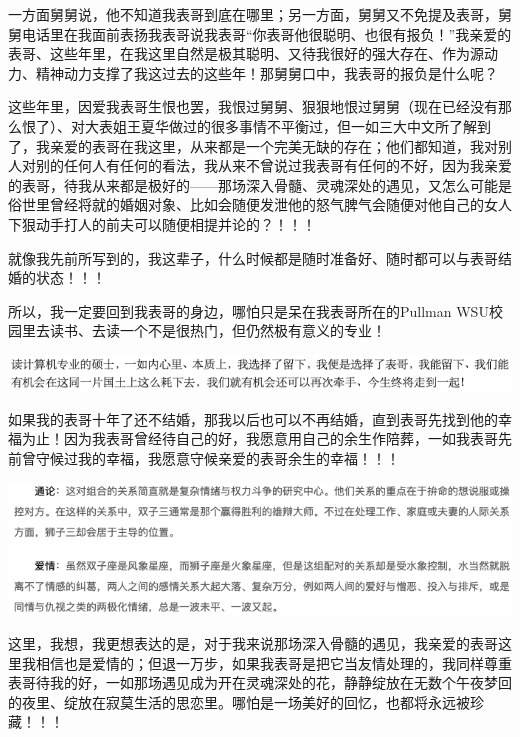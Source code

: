 \documentclass[9pt, b5paper]{article}
\begin{document}
一方面舅舅说，他不知道我表哥到底在哪里；另一方面，舅舅又不免提及表哥，舅舅电话里在我面前表扬我表哥说我表哥“你表哥他很聪明、也很有报负！”我亲爱的表哥、这些年里，在我这里自然是极其聪明、又待我很好的强大存在、作为源动力、精神动力支撑了我这过去的这些年！那舅舅口中，我表哥的报负是什么呢？

这些年里，因爱我表哥生恨也罢，我恨过舅舅、狠狠地恨过舅舅（现在已经没有那么恨了）、对大表姐王夏华做过的很多事情不平衡过，但一如三大中文所了解到了，我亲爱的表哥在我这里，从来都是一个完美无缺的存在；他们都知道，我对别人对别的任何人有任何的看法，我从来不曾说过我表哥有任何的不好，因为我亲爱的表哥，待我从来都是极好的——那场深入骨髓、灵魂深处的遇见，又怎么可能是俗世里曾经将就的婚姻对象、比如会随便发泄他的怒气脾气会随便对他自己的女人下狠动手打人的前夫可以随便相提并论的？！！！

就像我先前所写到的，我这辈子，什么时候都是随时准备好、随时都可以与表哥结婚的状态！！！

所以，我一定要回到我表哥的身边，哪怕只是呆在我表哥所在的Pullman WSU校园里去读书、去读一个不是很热门，但仍然极有意义的专业！

\begin{center}
\includegraphics[width=.9\linewidth]{./pic/readme_20210516_102713.png}
\end{center}

如果我的表哥十年了还不结婚，那我以后也可以不再结婚，直到表哥先找到他的幸福为止！因为我表哥曾经待自己的好，我愿意用自己的余生作陪葬，一如我表哥先前曾守候过我的幸福，我愿意守候亲爱的表哥余生的幸福！！！

\begin{center}
\includegraphics[width=.9\linewidth]{./pic/readme_20210515_095559.png}
\end{center}

这里，我想，我更想表达的是，对于我来说那场深入骨髓的遇见，我亲爱的表哥这里我相信也是爱情的；但退一万步，如果我表哥是把它当友情处理的，我同样尊重表哥待我的好，一如那场遇见成为开在灵魂深处的花，静静绽放在无数个午夜梦回的夜里、绽放在寂莫生活的思恋里。哪怕是一场美好的回忆，也都将永远被珍藏！！！
\end{document}
